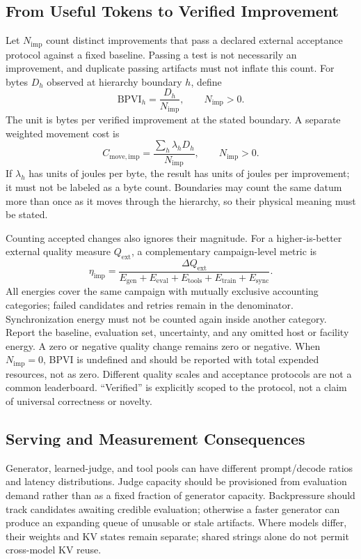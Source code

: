 \documentclass[journal]{IEEEtran}
\begin{document}
\subsection{From Useful Tokens to Verified Improvement}
Let $N_{\mathrm{imp}}$ count distinct improvements that pass a declared external acceptance protocol against a fixed baseline. Passing a test is not necessarily an improvement, and duplicate passing artifacts must not inflate this count. For bytes $D_h$ observed at hierarchy boundary $h$, define
\begin{equation}
\mathrm{BPVI}_h=\frac{D_h}{N_{\mathrm{imp}}},\qquad N_{\mathrm{imp}}>0.
\label{eq:bpvi}
\end{equation}
The unit is bytes per verified improvement at the stated boundary. A separate weighted movement cost is
\begin{equation}
C_{\mathrm{move,imp}}=\frac{\sum_h\lambda_hD_h}{N_{\mathrm{imp}}},\qquad N_{\mathrm{imp}}>0.
\label{eq:move-improve}
\end{equation}
If $\lambda_h$ has units of joules per byte, the result has units of joules per improvement; it must not be labeled as a byte count. Boundaries may count the same datum more than once as it moves through the hierarchy, so their physical meaning must be stated.

Counting accepted changes also ignores their magnitude. For a higher-is-better external quality measure $Q_{\mathrm{ext}}$, a complementary campaign-level metric is
\begin{equation}
\eta_{\mathrm{imp}}=\frac{\Delta Q_{\mathrm{ext}}}
{E_{\mathrm{gen}}+E_{\mathrm{eval}}+E_{\mathrm{tools}}+E_{\mathrm{train}}+E_{\mathrm{sync}}}.
\label{eq:quality-improve}
\end{equation}
All energies cover the same campaign with mutually exclusive accounting categories; failed candidates and retries remain in the denominator. Synchronization energy must not be counted again inside another category. Report the baseline, evaluation set, uncertainty, and any omitted host or facility energy. A zero or negative quality change remains zero or negative. When $N_{\mathrm{imp}}=0$, BPVI is undefined and should be reported with total expended resources, not as zero. Different quality scales and acceptance protocols are not a common leaderboard. ``Verified'' is explicitly scoped to the protocol, not a claim of universal correctness or novelty.

\subsection{Serving and Measurement Consequences}
Generator, learned-judge, and tool pools can have different prompt/decode ratios and latency distributions. Judge capacity should be provisioned from evaluation demand rather than as a fixed fraction of generator capacity. Backpressure should track candidates awaiting credible evaluation; otherwise a faster generator can produce an expanding queue of unusable or stale artifacts. Where models differ, their weights and KV states remain separate; shared strings alone do not permit cross-model KV reuse.
\end{document}
